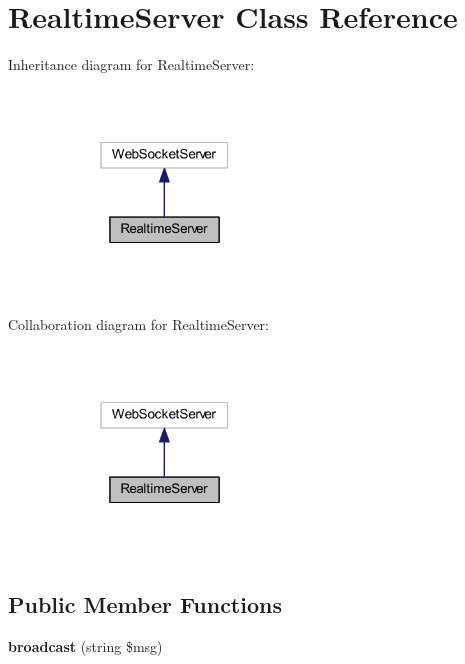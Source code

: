 \section{Realtime\+Server Class Reference}
\label{class_lora_1_1_realtime_server}


Inheritance diagram for Realtime\+Server\+:
\nopagebreak
\begin{figure}[H]
\begin{center}
\leavevmode
\includegraphics[width=175pt]{class_lora_1_1_realtime_server__inherit__graph}
\end{center}
\end{figure}


Collaboration diagram for Realtime\+Server\+:
\nopagebreak
\begin{figure}[H]
\begin{center}
\leavevmode
\includegraphics[width=175pt]{class_lora_1_1_realtime_server__coll__graph}
\end{center}
\end{figure}
\subsection*{Public Member Functions}
\begin{DoxyCompactItemize}
\item 
\mbox{\label{class_lora_1_1_realtime_server_a473114c92843eda7de537f42ffde8913}} 
{\bfseries broadcast} (string \$msg)
\end{DoxyCompactItemize}
